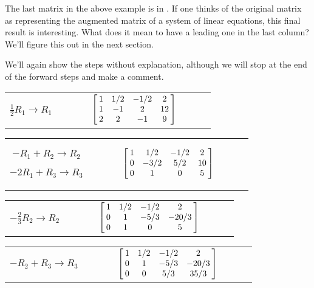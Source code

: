 The last matrix in the above example is in \rref. If one thinks of the original matrix as representing the augmented matrix of a system of linear equations, this final result is interesting. What does it mean to have a leading one in the last column? We'll figure this out in the next section.\\

{We'll again show the steps without explanation, although we will stop at the end of the forward steps and make a comment.

\begin{center}\begin{tabular}{ccl}
\parbox{70pt}{\centering\small $\frac12R_1\rightarrow R_1$}
&$\quad \quad$&
$\bmx{cccc}1&1/2&-1/2&2\\1&-1&2&12\\2&2&-1&9\\\emx$
\end{tabular}\end{center}

\begin{center}\begin{tabular}{ccl}
\parbox{70pt}{\centering\small $-R_1+R_2\rightarrow R_2$\\

$-2R_1+R_3\rightarrow R_3$}
&$\quad \quad$&
$\bmx{cccc}1&1/2&-1/2&2\\0&-3/2&5/2&10\\0&1&0&5\\\emx$
\end{tabular}\end{center}

\begin{center}\begin{tabular}{ccl}
\parbox{70pt}{\centering\small $-\frac23R_2\rightarrow R_2$\\}
&$\quad \quad$&
$\bmx{cccc}1&1/2&-1/2&2\\0&1&-5/3&-20/3\\0&1&0&5\\ \emx$
\end{tabular}\end{center}

\begin{center}\begin{tabular}{ccl}
\parbox{70pt}{\centering\small $-R_2+R_3\rightarrow R_3$\\}
&$\quad \quad$&
$\bmx{cccc}1&1/2&-1/2&2\\0&1&-5/3&-20/3\\0&0&5/3&35/3\\ \emx$
\end{tabular}\end{center}

}
